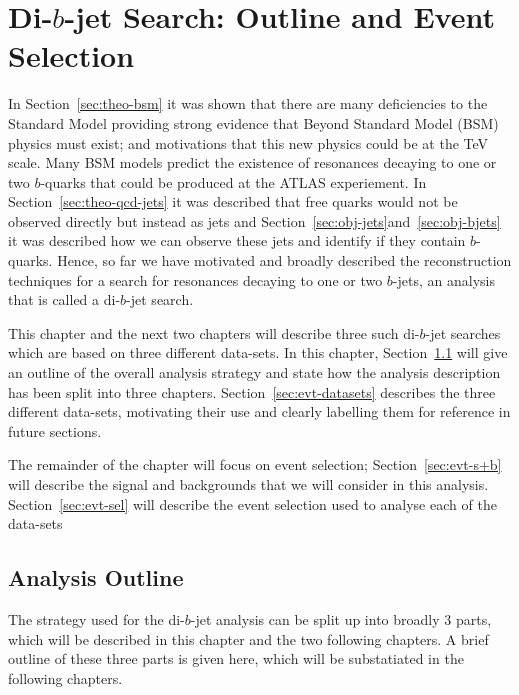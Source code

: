 \chapter{Di-$b$-jet Search: Outline and Event Selection}
\label{sec:evt}

In Section~\ref{sec:theo-bsm} it was shown that there are many deficiencies to the Standard Model
providing strong evidence that Beyond Standard Model (BSM) physics must exist; and motivations that this new physics could be at the TeV scale.
Many BSM models predict the existence of resonances decaying to one or two $b$-quarks that could be produced at the ATLAS experiement.
In Section~\ref{sec:theo-qcd-jets} it was described that free quarks would not be observed directly but instead as jets
and Section~\ref{sec:obj-jets}and~\ref{sec:obj-bjets} it was described how we can observe these jets and identify if they contain $b$-quarks.
Hence, so far we have motivated and broadly described the reconstruction techniques for
a search for resonances decaying to one or two $b$-jets,
an analysis that is called a di-$b$-jet search.

This chapter and the next two chapters will describe 
three such di-$b$-jet searches which are based on three different data-sets.
In this chapter, Section~\ref{sec:evt-outline} will give an outline of the
overall analysis strategy
and state how the analysis description has been split into three chapters.
Section~\ref{sec:evt-datasets}
describes the three different data-sets, motivating their use
and clearly labelling them for reference in future sections.

The remainder of the chapter will focus on event selection;
Section~\ref{sec:evt-s+b} will describe the signal and backgrounds
that we will consider in this analysis.
Section~\ref{sec:evt-sel} will describe
the event selection used to analyse each of the data-sets

\section{Analysis Outline}
\label{sec:evt-outline}

The strategy used for the di-$b$-jet analysis can be split up into broadly 3 parts,
which will be described in this chapter and the two following chapters.
A brief outline of these three parts is given here,
which will be substatiated in the following chapters.

